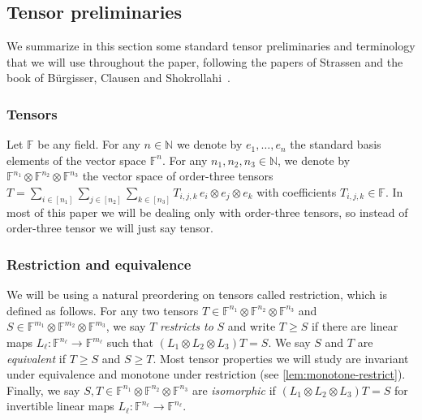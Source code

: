 \documentclass[11pt]{article}
\newcommand{\FF}{\mathbb{F}}
\newcommand{\NN}{\mathbb{N}}
\begin{document}
\subsection{Tensor preliminaries}\label{subsec:prelim}

We summarize in this section some standard tensor preliminaries and terminology that we will use throughout the paper, following the papers of Strassen \cite{MR882307,strassen1988asymptotic,strassen1991degeneration} and the book of Bürgisser, Clausen and Shokrollahi~\cite{burgisser1997algebraic}.


\subsubsection*{Tensors}
%
%
Let $\FF$ be any field. For any $n \in \NN$ we denote by $e_1, \ldots, e_n$ the standard basis elements of the vector space $\FF^n$. For any $n_1, n_2, n_3 \in \NN$, we denote by $\FF^{n_1} \otimes \FF^{n_2} \otimes \FF^{n_3}$ the vector space of order-three tensors $T = \sum_{i \in [n_1]} \sum_{j \in [n_2]} \sum_{k \in [n_3]} T_{i,j,k}\, e_i \otimes e_j \otimes e_k$ with coefficients $T_{i,j,k} \in \FF$. In most of this paper we will be dealing only with order-three tensors, so instead of order-three tensor we will just say tensor. 

%
\subsubsection*{Restriction and equivalence} 
We will be using a natural preordering on tensors called restriction, which is defined as follows. For any two tensors $T \in \FF^{n_1} \otimes \FF^{n_2} \otimes \FF^{n_3}$ and $S \in \FF^{m_1} \otimes \FF^{m_2} \otimes \FF^{m_3}$, we say $T$ \emph{restricts to} $S$ and write $T \geq S$ if there are linear maps $L_\ell : \FF^{n_\ell} \to \FF^{m_\ell}$ such that $(L_1 \otimes L_2 \otimes L_3)T = S$. We say $S$ and $T$ are \emph{equivalent} if $T \geq S$ and $S \geq T$. Most tensor properties we will study are invariant under equivalence and monotone under restriction (see \autoref{lem:monotone-restrict}). Finally, we say $S, T \in \FF^{n_1} \otimes \FF^{n_2} \otimes \FF^{n_3}$ are \emph{isomorphic} if $(L_1 \otimes L_2 \otimes L_3)T = S$ for invertible linear maps $L_\ell : \FF^{n_\ell} \to \FF^{n_\ell}$.
%
\end{document}
